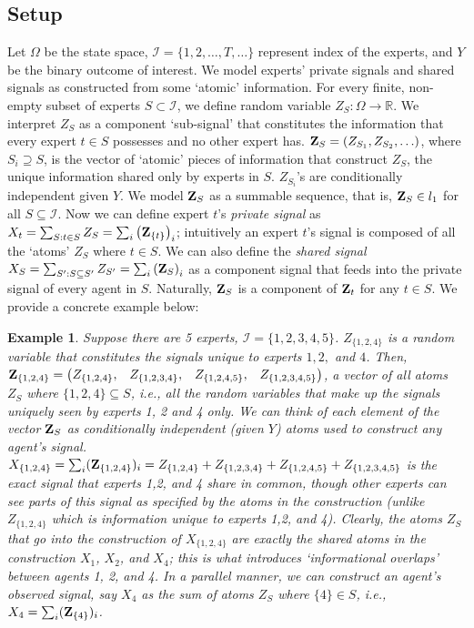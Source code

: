 \documentclass{winnower}
\newtheorem{example}{Example}
\begin{document}
\subsection{Setup} 
Let $\Omega$ be the state space, $\mathcal{I} = \{1, 2, \ldots, T, \ldots\}$ represent index of the experts, and $Y$ be the binary outcome of interest. We model experts' private signals and shared signals as constructed from some `atomic' information. For every finite, non-empty subset of experts $S \subset \mathcal{I}$, we define random variable $Z_S: \Omega \rightarrow \mathbb{R}$. We interpret $Z_S$ as a component `sub-signal' that constitutes the information that every expert $t \in S$ possesses and no other expert has. ${\bf Z}_{S} = (Z_{S_1}, Z_{S_2}, \ldots )$, where $S_i \supseteq S$, is the vector of `atomic' pieces of information that construct $Z_S$, the unique information shared only by experts in $S$. $Z_{S_i}$'s are conditionally independent given $Y$. We model ${\bf Z}_{S}$ as a summable sequence, that is, ${\bf Z}_{S}\in l_1$ for all $S\subseteq \mathcal{I}$. Now we can define expert $t$'s \emph{private signal} as $X_t = \sum_{S: t\in S} Z_S = \sum_{i} \left({\bf Z}_{\{t\}}\right)_i$; intuitively an expert $t$'s signal is composed of all the `atoms' $Z_S$ where $t \in S$. We can also define the \emph{shared signal} $X_S = \sum_{S': S \subseteq S'} Z_{S'} = \sum_{i} \left({\bf Z}_{S}\right)_i$ as a component signal that feeds into the private signal of every agent in $S$. Naturally, ${\bf Z}_S$ is a component of ${\bf Z}_t$ for any $t \in S$. We provide a concrete example below:
   


\begin{example}
    Suppose there are 5 experts, $\mathcal{I} = \{1, 2, 3, 4, 5\}$. $Z_{\{1, 2, 4\}}$ is a random variable that constitutes the signals unique to experts $1, 2,$ and $4$. Then, ${\bf Z}_{\{1, 2, 4\}} = \begin{pmatrix} Z_{\{1,2,4\}}, & Z_{\{1,2,3,4\}}, & Z_{\{1,2,4,5\}}, & Z_{\{1,2,3,4,5\}} \end{pmatrix}$, a vector of all atoms $Z_S$ where $\{1, 2, 4\} \subseteq S$, i.e., all the random variables that make up the signals uniquely seen by experts 1, 2 and 4 only.  We can think of each element of the vector ${\bf Z}_S$ as conditionally independent (given $Y$) atoms used to construct any agent's signal. $X_{\{1,2,4\}} = \sum_i ({\bf Z}_{\{1,2,4\}})_i=Z_{\{1,2,4\}}+Z_{\{1,2,3,4\}}+Z_{\{1,2,4,5\}}+Z_{\{1,2,3,4,5\}}$ is the exact signal that experts 1,2, and 4 share in common, though other experts can see parts of this signal as specified by the atoms in the construction (unlike $Z_{\{1,2,4\}}$ which is information unique to experts 1,2, and 4). Clearly, the atoms $Z_S$ that go into the construction of $X_{\{1,2,4\}}$ are exactly the shared atoms in the construction $X_1$, $X_2$, and $X_{4}$; this is what introduces `informational overlaps' between agents 1, 2, and 4. In a parallel manner, we can construct an agent's observed signal, say $X_4$ as the sum of atoms $Z_S$ where $\{4\} \in S$, i.e., $X_4 = \sum_i ({\bf Z}_{\{4\}})_i$.
\end{example}
\end{document}
